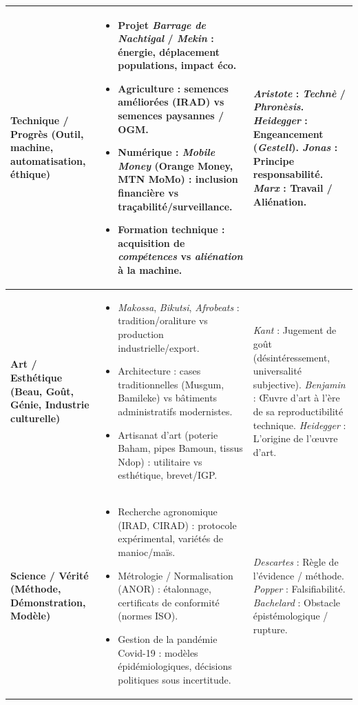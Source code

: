 \documentclass[11pt]{article}
\begin{document}
\begin{popfigure}
\begin{center}
\begin{tabularx}{\linewidth}{|>{\bfseries}l|X|X|}
\textbf{Technique / Progrès} (Outil, machine, automatisation, éthique) & \begin{itemize}\item Projet \emph{Barrage de Nachtigal} / \emph{Mekin} : énergie, déplacement populations, impact éco.\item Agriculture : semences améliorées (IRAD) vs semences paysannes / OGM.\item Numérique : \emph{Mobile Money} (Orange Money, MTN MoMo) : inclusion financière vs traçabilité/surveillance.\item Formation technique : acquisition de \emph{compétences} vs \emph{aliénation} à la machine.\end{itemize} & \emph{Aristote} : \emph{Technè} / \emph{Phronèsis}. \emph{Heidegger} : Engeancement (\emph{Gestell}). \emph{Jonas} : Principe responsabilité. \emph{Marx} : Travail / Aliénation. \\ \hline
\textbf{Art / Esthétique} (Beau, Goût, Génie, Industrie culturelle) & \begin{itemize}\item \emph{Makossa}, \emph{Bikutsi}, \emph{Afrobeats} : tradition/oraliture vs production industrielle/export.\item Architecture : cases traditionnelles (Musgum, Bamileke) vs bâtiments administratifs modernistes.\item Artisanat d'art (poterie Baham, pipes Bamoun, tissus Ndop) : utilitaire vs esthétique, brevet/IGP.\end{itemize} & \emph{Kant} : Jugement de goût (désintéressement, universalité subjective). \emph{Benjamin} : Œuvre d'art à l'ère de sa reproductibilité technique. \emph{Heidegger} : L'origine de l'œuvre d'art. \\ \hline
\textbf{Science / Vérité} (Méthode, Démonstration, Modèle) & \begin{itemize}\item Recherche agronomique (IRAD, CIRAD) : protocole expérimental, variétés de manioc/maïs.\item Métrologie / Normalisation (ANOR) : étalonnage, certificats de conformité (normes ISO).\item Gestion de la pandémie Covid-19 : modèles épidémiologiques, décisions politiques sous incertitude.\end{itemize} & \emph{Descartes} : Règle de l'évidence / méthode. \emph{Popper} : Falsifiabilité. \emph{Bachelard} : Obstacle épistémologique / rupture. \\ \hline
\end{tabularx}
\end{center}
\end{popfigure}
\end{document}
